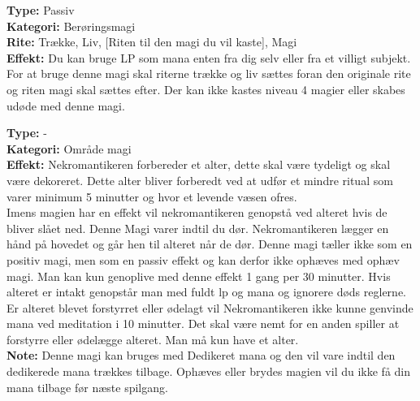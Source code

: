 \begin{død*}
\textbf{Type:} Passiv\\
\textbf{Kategori:} Berøringsmagi\\
\textbf{Rite:} Trække, Liv, [Riten til den magi du vil kaste], Magi\\
\textbf{Effekt:} Du kan bruge LP som mana enten fra dig selv eller fra et villigt subjekt. For at bruge denne magi skal riterne trække og liv sættes foran den originale rite og riten magi skal sættes efter. Der kan ikke kastes niveau 4 magier eller skabes udøde med denne magi.
\end{død*}

\begin{død*}
\textbf{Type:} - \\
\textbf{Kategori:} Område magi\\
\textbf{Effekt:} Nekromantikeren forbereder et alter, dette skal være tydeligt og skal være dekoreret. Dette alter bliver forberedt ved at udfør et mindre ritual som varer minimum 5 minutter og hvor et levende væsen ofres.\\ 
Imens magien har en effekt vil nekromantikeren genopstå  ved alteret hvis de bliver slået ned. Denne Magi varer indtil du dør. Nekromantikeren lægger en hånd på hovedet og går hen til alteret når de dør. Denne magi tæller ikke som en positiv magi, men som en passiv effekt og kan derfor ikke ophæves med ophæv magi.  Man kan kun genoplive med denne effekt 1 gang per 30 minutter. Hvis alteret er intakt genopstår man med fuldt lp og mana og ignorere døds reglerne. Er alteret blevet forstyrret eller ødelagt vil Nekromantikeren ikke kunne genvinde mana ved meditation i 10 minutter. Det skal være nemt for en anden spiller at forstyrre eller ødelægge alteret. Man må kun have et alter.\\
\textbf{Note:} Denne magi kan bruges med Dedikeret mana og den vil vare indtil den dedikerede mana trækkes tilbage. Ophæves eller brydes magien vil du ikke få din mana tilbage før næste spilgang.\\
\end{død*}